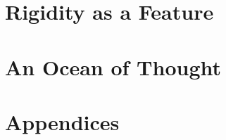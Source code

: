 \setlength{\parskip}{\defparskip}

\setcounter{footnote}{0}
\setcounter{section}{1}

\renewcommand{\thesection}{}
\renewcommand{\thesubsection}{}
\renewcommand{\thesubsubsection}{}



\mainmatter

\renewcommand{\headerdelim}{.}
\renewcommand{\thesection}{\arabic{section}}
\renewcommand{\thesubsection}{\thesection.\arabic{subsection}}
\renewcommand{\thesubsubsection}{\thesection.\thesubsection.\roman{subsubsection}}
\renewcommand{\chaptermark}[1]{\markboth{\chaptertitlename~\thechapter.\ #1}{}}
\renewcommand{\sectionmark}[1]{\markright{#1}}
\renewcommand{\thefootnote}{\arabic{footnote}}

\part{Rigidity as a Feature}













\part{An Ocean of Thought}


\appendix
\part{Appendices}


\newpage
\backmatter

\titleformat{\chapter}[hang]{\Large}{\filright\enspace\thechapter\enspace}{2.5cm}{\Large\bfseries\filcenter}
{}
\printbibliography

